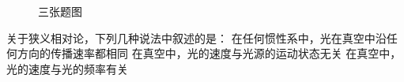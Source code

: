 \begin{figure}[!h]
	\caption{三张题图}
\end{figure}
关于狭义相对论，下列几种说法中叙述的是：
{在任何惯性系中，光在真空中沿任何方向的传播速率都相同}
{在真空中，光的速度与光源的运动状态无关}
{在真空中，光的速度与光的频率有关}

